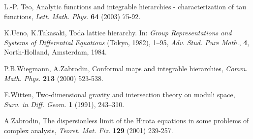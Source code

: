 \documentclass[numbook, envcountsame, envcountreset]{svjour3}
\begin{document}
\begin{thebibliography}{99}
 L.-P. Teo, Analytic functions and integrable hierarchies - characterization of tau functions, {\it Lett. Math. Phys.} {\bf 64} (2003) 75-92.

 K.Ueno, K.Takasaki,  Toda lattice hierarchy. In: {\it Group Representations and Systems of Differential Equations} (Tokyo, 1982), 1--95, {\it Adv. Stud. Pure Math.}, {\bf 4}, North-Holland, Amsterdam, 1984.

 P.B.Wiegmann, A.Zabrodin, Conformal maps and integrable hierarchies, {\it Comm. Math. Phys.} {\bf 213} (2000) 523-538.

 E.Witten, Two-dimensional gravity and intersection theory
on moduli space, {\it Surv. in Diff. Geom.} {\bf 1} (1991), 243--310.

 A.Zabrodin, The dispersionless limit of the Hirota equations in some problems of complex analysis, {\it Teoret. Mat. Fiz.} {\bf 129} (2001) 239-257.

\end{thebibliography}
\end{document}
